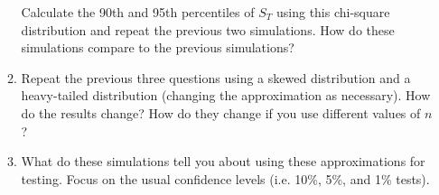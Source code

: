 \begin{enumerate}
\begin{enumerate}
    Calculate the 90th and 95th percentiles of $S_T$ using this
    chi-square distribution and repeat the previous two simulations.
    How do these simulations compare to the previous simulations?
  \item Repeat the previous three questions using a skewed
    distribution and a heavy-tailed distribution (changing the
    approximation as necessary).  How do the results change?  How do
    they change if you use different values of $n$?
  \item What do these simulations tell you about using these
    approximations for testing.  Focus on the usual confidence levels
    (i.e. 10\%, 5\%, and 1\% tests).
  \end{enumerate}

\end{enumerate}
